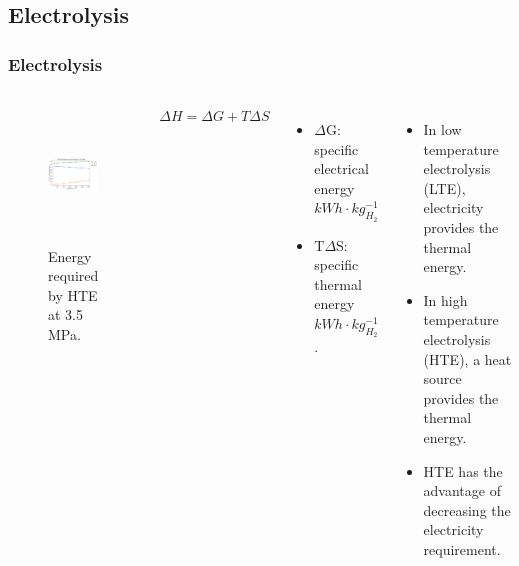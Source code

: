 \subsection{Electrolysis}
\begin{frame}
\frametitle{Electrolysis}
\begin{columns}
    \column[t]{5cm}
	\begin{figure}[htbp!]
		\begin{center}
			\includegraphics[height=3.6cm]{images/hte-energy-P.png}
		\end{center}
		\caption{Energy required by HTE at 3.5 MPa.}
	\end{figure}

	\column[t]{5cm}
	$\Delta H = \Delta G + T \Delta S$
	\begin{itemize}
		\item $\Delta$G: specific electrical energy $kWh \cdot kg_{H_2}^{-1}$
		\item T$\Delta$S: specific thermal energy $kWh \cdot kg_{H_2}^{-1}$.
	\end{itemize}
    \vspace{0.7cm}

	\begin{itemize}
    	\item In low temperature electrolysis (LTE), electricity provides the thermal energy.
    	\item In high temperature electrolysis (HTE), a heat source provides the thermal energy.
    	\item HTE has the advantage of decreasing the electricity requirement.
    \end{itemize}
\end{columns}
\end{frame}

